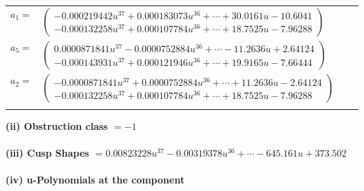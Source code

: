 \documentclass[1p]{elsarticle_modified}
\theoremstyle{definition}
\begin{document}
\begin{tabular}{m{7pt} m{180pt} m{7pt} m{180pt} }
\flushright $a_{1}=$&$\begin{pmatrix}-0.000219442 u^{37}+0.000183073 u^{36}+\cdots+30.0161 u-10.6041\\-0.000132258 u^{37}+0.000107784 u^{36}+\cdots+18.7525 u-7.96288\end{pmatrix}$ \\
\flushright $a_{5}=$&$\begin{pmatrix}0.0000871841 u^{37}-0.0000752884 u^{36}+\cdots-11.2636 u+2.64124\\-0.000143931 u^{37}+0.000121946 u^{36}+\cdots+19.9165 u-7.66444\end{pmatrix}$ \\
\flushright $a_{2}=$&$\begin{pmatrix}-0.0000871841 u^{37}+0.0000752884 u^{36}+\cdots+11.2636 u-2.64124\\-0.000132258 u^{37}+0.000107784 u^{36}+\cdots+18.7525 u-7.96288\end{pmatrix}$\\&\end{tabular}
\flushleft \textbf{(ii) Obstruction class $= -1$}\\~\\
\flushleft \textbf{(iii) Cusp Shapes $= 0.00823228 u^{37}-0.00319378 u^{36}+\cdots-645.161 u+373.502$}\\~\\
\newpage\renewcommand{\arraystretch}{1}
\flushleft \textbf{(iv) u-Polynomials at the component}\newline \\
\end{document}
